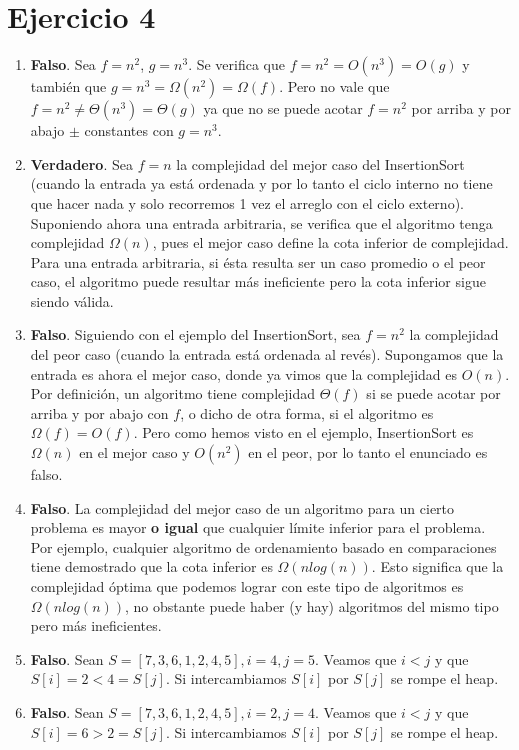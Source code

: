 \section*{Ejercicio 4}

\begin{enumerate}
    \item \textbf{Falso}. Sea $f = n^2$, $g = n^3$. Se verifica que $f = n^2 = O(n^3) = O(g)$ y también que $g = n^3 = \Omega(n^2) = \Omega(f)$. Pero no vale que $f = n^2 \neq \Theta(n^3) = \Theta(g)$ ya que no se puede acotar $f = n^2$ por arriba y por abajo $\pm$ constantes con $g = n^3$.
    \item \textbf{Verdadero}. Sea $f = n$ la complejidad del mejor caso del InsertionSort (cuando la entrada ya está ordenada y por lo tanto el ciclo interno no tiene que hacer nada y solo recorremos 1 vez el arreglo con el ciclo externo). Suponiendo ahora una entrada arbitraria, se verifica que el algoritmo tenga complejidad $\Omega(n)$, pues el mejor caso define la cota inferior de complejidad. Para una entrada arbitraria, si ésta resulta ser un caso promedio o el peor caso, el algoritmo puede resultar más ineficiente pero la cota inferior sigue siendo válida.
    \item \textbf{Falso}. Siguiendo con el ejemplo del InsertionSort, sea $f = n^2$ la complejidad del peor caso (cuando la entrada está ordenada al revés). Supongamos que la entrada es ahora el mejor caso, donde ya vimos que la complejidad es $O(n)$. Por definición, un algoritmo tiene complejidad $\Theta(f)$ si se puede acotar por arriba y por abajo con $f$, o dicho de otra forma, si el algoritmo es $\Omega(f) = O(f)$. Pero como hemos visto en el ejemplo, InsertionSort es $\Omega(n)$ en el mejor caso y $O(n^2)$ en el peor, por lo tanto el enunciado es falso.
    \item \textbf{Falso}. La complejidad del mejor caso de un algoritmo para un cierto problema es mayor \textbf{o igual} que cualquier límite inferior para el problema. Por ejemplo, cualquier algoritmo de ordenamiento basado en comparaciones tiene demostrado que la cota inferior es $\Omega(n log(n))$. Esto significa que la complejidad óptima que podemos lograr con este tipo de algoritmos es $\Omega(n log(n))$, no obstante puede haber (y hay) algoritmos del mismo tipo pero más ineficientes.
    \item \textbf{Falso}. Sean $S = [7, 3, 6, 1, 2, 4, 5], i = 4, j = 5$. Veamos que $i < j$ y que $S[i] = 2 < 4 = S[j]$. Si intercambiamos $S[i]$ por $S[j]$ se rompe el heap.
    \item \textbf{Falso}. Sean $S = [7, 3, 6, 1, 2, 4, 5], i = 2, j = 4$. Veamos que $i < j$ y que $S[i] = 6 > 2 = S[j]$. Si intercambiamos $S[i]$ por $S[j]$ se rompe el heap.
\end{enumerate}
